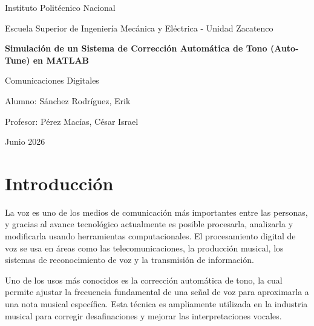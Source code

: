\documentclass[12pt]{article}
\begin{document}

\begin{titlepage}

\centering

{\Large Instituto Politécnico Nacional\par}

\vspace{1cm}

{\large Escuela Superior de Ingeniería Mecánica y Eléctrica - Unidad Zacatenco}

\vspace{3cm}

{\Huge \textbf{Simulación de un Sistema de Corrección Automática de Tono (Auto-Tune) en MATLAB} \par}

\vspace{3cm}

{\Large Comunicaciones Digitales \par}

\vfil

{\large
Alumno: Sánchez Rodríguez, Erik \par 
}

\vspace{0.5cm}

{\large
Profesor: Pérez Macías, César Israel \par 
}

\vspace{1cm}

{\large
Junio 2026
\par} 

\end{titlepage}



\tableofcontents
\newpage



\section{Introducción}

La voz es uno de los medios de comunicación más importantes entre las personas, y gracias al avance tecnológico actualmente es posible procesarla, analizarla y modificarla usando herramientas computacionales. El procesamiento digital de voz se usa en áreas como las telecomunicaciones, la producción musical, los sistemas de reconocimiento de voz y la transmisión de información.

Uno de los usos más conocidos es la corrección automática de tono, la cual permite ajustar la frecuencia fundamental de una señal de voz para aproximarla a una nota musical específica. Esta técnica es ampliamente utilizada en la industria musical para corregir desafinaciones y mejorar las interpretaciones vocales.
\end{document}
